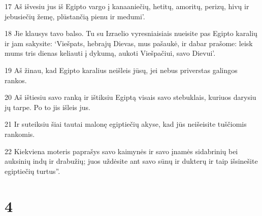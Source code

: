 \par 17 Aš išvesiu jus iš Egipto vargo į kanaaniečių, hetitų, amoritų, perizų, hivų ir jebusiečių žemę, plūstančią pienu ir medumi’. 
\par 18 Jie klausys tavo balso. Tu su Izraelio vyresniaisiais nueisite pas Egipto karalių ir jam sakysite: ‘Viešpats, hebrajų Dievas, mus pašaukė, ir dabar prašome: leisk mums tris dienas keliauti į dykumą, aukoti Viešpačiui, savo Dievui’. 
\par 19 Aš žinau, kad Egipto karalius neišleis jūsų, jei nebus priverstas galingos rankos. 
\par 20 Aš ištiesiu savo ranką ir ištiksiu Egiptą visais savo stebuklais, kuriuos darysiu jų tarpe. Po to jis išleis jus. 
\par 21 Ir suteiksiu šiai tautai malonę egiptiečių akyse, kad jūs neišeisite tuščiomis rankomis. 
\par 22 Kiekviena moteris paprašys savo kaimynės ir savo įnamės sidabrinių bei auksinių indų ir drabužių; juos uždėsite ant savo sūnų ir dukterų ir taip išsinešite egiptiečių turtus”.



\chapter{4}


